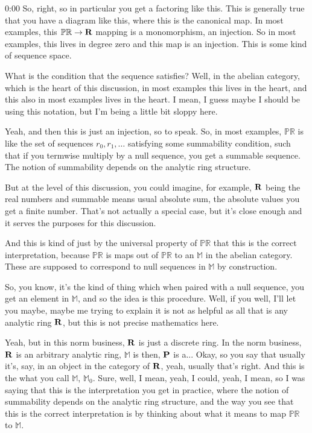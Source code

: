 \begin{unfinished}{0:00}
So, right, so in particular you get a factoring like this. This is generally true that you have a diagram like this, where this is the canonical map. In most examples, this $\mathbb{PR} \to \R$ mapping is a monomorphism, an injection. So in most examples, this lives in degree zero and this map is an injection. This is some kind of sequence space.

What is the condition that the sequence satisfies? Well, in the abelian category, which is the heart of this discussion, in most examples this lives in the heart, and this also in most examples lives in the heart. I mean, I guess maybe I should be using this notation, but I'm being a little bit sloppy here.

Yeah, and then this is just an injection, so to speak. So, in most examples, $\mathbb{PR}$ is like the set of sequences $r_0, r_1, \dots$ satisfying some summability condition, such that if you termwise multiply by a null sequence, you get a summable sequence. The notion of summability depends on the analytic ring structure.

But at the level of this discussion, you could imagine, for example, $\R$ being the real numbers and summable means usual absolute sum, the absolute values you get a finite number. That's not actually a special case, but it's close enough and it serves the purposes for this discussion.

And this is kind of just by the universal property of $\mathbb{PR}$ that this is the correct interpretation, because $\mathbb{PR}$ is maps out of $\mathbb{PR}$ to an $\mathbb{M}$ in the abelian category. These are supposed to correspond to null sequences in $\mathbb{M}$ by construction.

So, you know, it's the kind of thing which when paired with a null sequence, you get an element in $\mathbb{M}$, and so the idea is this procedure. Well, if you well, I'll let you maybe, maybe me trying to explain it is not as helpful as all that is any analytic ring $\R$, but this is not precise mathematics here.

Yeah, but in this norm business, $\R$ is just a discrete ring. In the norm business, $\R$ is an arbitrary analytic ring, $\mathbb{M}$ is then, $\P$ is a... Okay, so you say that usually it's, say, in an object in the category of $\R$, yeah, usually that's right. And this is the what you call $\mathbb{M}$, $\mathbb{M}_0$. Sure, well, I mean, yeah, I could, yeah, I mean, so I was saying that this is the interpretation you get in practice, where the notion of summability depends on the analytic ring structure, and the way you see that this is the correct interpretation is by thinking about what it means to map $\mathbb{PR}$ to $\mathbb{M}$.


\end{unfinished}
